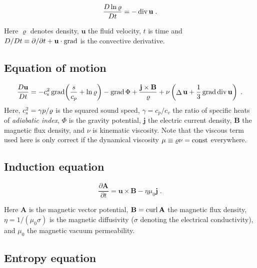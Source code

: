 \documentclass[12pt,twoside,notitlepage,a4paper]{article}
\newcommand{\grad}    {\mathop{\rm grad}\nolimits}
\newcommand{\Div}     {\mathop{\rm div}\nolimits}
\newcommand{\curl}    {\mathop{\rm curl}\nolimits}
\newcommand{\Laplace} {\mathop{\Delta}\nolimits}
\newcommand{\vekt}[1] {\mathbf{#1}}
\newcommand{\const}   {\mbox{\rm const}}
\newcommand{\Av}            {\vekt{A}}
\newcommand{\Bv}            {\vekt{B}}
\newcommand{\cs}            {c_{\rm s}}
\newcommand{\jv}            {\vekt{j}}
\newcommand{\uv}            {\vekt{u}}
\begin{document}
\begin{equation}
  \frac{D\ln\varrho}{Dt}
  = - \Div\uv \; .
\end{equation}

Here $\varrho$ denotes density, $\uv$ the fluid velocity, $t$ is time and
$D/Dt \equiv \partial/\partial t + \uv\cdot\grad$ is the convective
derivative.


\subsection{Equation of motion}

\begin{equation}
  \frac{D\uv}{Dt}
   =  -\cs^2\grad\biggl(\frac{s}{c_p} + \ln\varrho\biggr)
      - \grad\Phi
      + \frac{\jv\times\Bv}{\varrho}
      + \nu \left( \Laplace\uv + \frac{1}{3}\grad\Div\uv \right) \; .
\end{equation}
Here, $\cs^2 = \gamma p/\varrho$ is the squared sound speed,
$\gamma=c_p/c_v$ the ratio of specific heats of \emph{adiabatic index},
$\Phi$ is the gravity potential, $\jv$ the electric current density, $\Bv$
the magnetic flux density, and $\nu$ is kinematic viscosity.
Note that the viscous term used here is only correct if the dynamical
viscosity $\mu \equiv \varrho\nu = \const$ everywhere.


\subsection{Induction equation}

\begin{equation}
  \frac{\partial\Av}{\partial t}
  = \uv\times\Bv - \eta\mu_0\jv \; .
\end{equation}

Here $\Av$ is the magnetic vector potential,
$\Bv = \curl\Av$ the magnetic
flux density, $\eta = 1/(\mu_0\sigma)$ is the magnetic diffusivity
($\sigma$ denoting the electrical conductivity), and $\mu_0$ the
magnetic vacuum permeability.



\subsection{Entropy equation}
\end{document}
